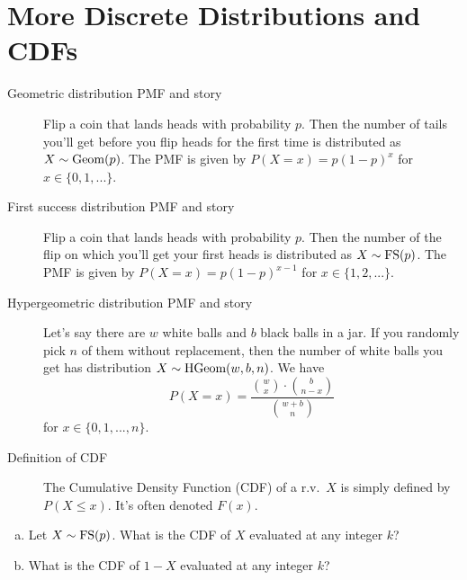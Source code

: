 \documentclass{article}
\begin{document}
 

\header

\section{More Discrete Distributions and CDFs}

\begin{description}
    \item[Geometric distribution PMF and story] Flip a coin that lands heads with probability $p$. Then the number of tails you'll get before you flip heads for the first time is distributed as $X \sim \textrm{Geom}(p)$. The PMF is given by $P(X=x) = p(1 - p)^x$ for $x \in \{0,1,...\}$.
    
    \item[First success distribution PMF and story] Flip a coin that lands heads with probability $p$. Then the number of the flip on which you'll get your first heads is distributed as $X \sim \textrm{FS}(p)$. The PMF is given by $P(X=x) = p(1-p)^{x-1}$ for $x \in \{1,2,...\}$.
    
    \item[Hypergeometric distribution PMF and story] Let's say there are $w$ white balls and $b$ black balls in a jar. If you randomly pick $n$ of them without replacement, then the number of white balls you get has distribution $X \sim \textrm{HGeom}(w,b,n)$. We have $$P(X=x) = \frac{\binom{w}{x} \cdot \binom{b}{n-x}}{\binom{w+b}{n}}$$ for $x \in \{0,1,...,n\}$.
    
    \item[Definition of CDF] The Cumulative Density Function (CDF) of a r.v.~$X$ is simply defined by $P(X \leq x)$. It's often denoted $F(x)$.
    
\end{description}



\begin{enumerate}[(a)]
\item Let $X \sim \textrm{FS}(p)$. What is the CDF of $X$ evaluated at any integer $k$? \\

\item What is the CDF of $1-X$ evaluated at any integer $k$?
\end{enumerate}
\end{document}
